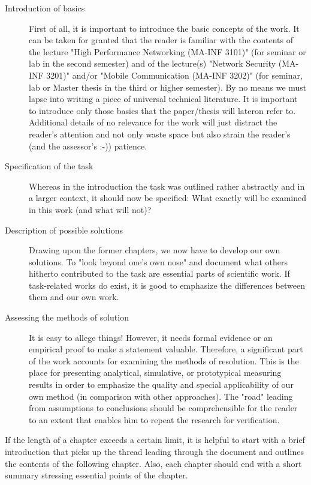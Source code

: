 \begin{description}
  
\item[Introduction of basics] First of all, it is important to
  introduce the basic concepts of the work. It can be taken for granted
  that the reader is familiar with the contents of the lecture 
  "High Performance Networking (MA-INF 3101)" (for seminar or lab in the
  second semester) and of the lecture(s) "Network Security (MA-INF 3201)"
  and/or "Mobile Communication (MA-INF 3202)" (for seminar, lab or 
  Master thesis in the third or higher semester). By no
  means we must lapse into writing a piece of universal technical literature.
  It is important to introduce only those basics that the paper/thesis will
  lateron refer to. Additional details of no relevance for the work will just
  distract the reader's attention and not only waste space but also
  strain the reader's (and the assessor's :-)) patience.
  
\item[Specification of the task] Whereas in the introduction the task 
  was outlined rather abstractly and in a larger context, it should now be
  specified: What exactly will be examined in this work (and what will not)?
  
\item[Description of possible solutions] Drawing upon the former
  chapters, we now have to develop our own solutions. To "look beyond
  one's own nose" and document what others hitherto contributed to the
  task are essential parts of scientific work. If task-related works do exist,
  it is good to emphasize the differences between them and our own work.

\item[Assessing the methods of solution] It is easy to allege things!
  However, it needs formal evidence or an empirical proof to make a statement
  valuable. Therefore, a significant part of the work accounts for examining the
  methods of resolution. This is the place for presenting analytical, simulative,
  or prototypical measuring results in order to emphasize the quality and special
  applicability of our own method (in comparison with other approaches). The
  "road" leading from assumptions to conclusions should be comprehensible
  for the reader to an extent that enables him to repeat the research for 
  verification.

\end{description}

If the length of a chapter exceeds a certain limit, it is helpful to start with a
brief introduction that picks up the thread leading through the document and outlines
the contents of the following chapter. Also, each chapter should end with a short
summary stressing essential points of the chapter.


